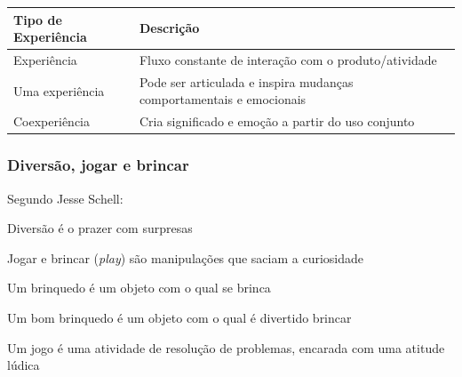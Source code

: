 \expandafter\documentclass\expandafter[table, usenames, svgnames, dvipsnames, \classopts]{beamer}
\begin{document}
\begin{frame}
	\begin{table}
		\tiny
		\setlength{\tabcolsep}{5pt}
		\renewcommand{\arraystretch}{1}
		\begin{tabular}{ll}
			\toprule
			\textbf{Tipo de Experiência} & \textbf{Descrição}\\
			\midrule
			Experiência & Fluxo constante de interação com o produto/atividade\\
			Uma experiência & Pode ser articulada e inspira mudanças comportamentais e emocionais\\
			Coexperiência & Cria significado e emoção a partir do uso conjunto\\
			\bottomrule
		\end{tabular}
	\end{table}

\end{frame}

\begin{frame}
	\frametitle{\textbf{Diversão, jogar e brincar}}

	Segundo Jesse Schell:

	\vspace{1em}

	\begin{outline}
		\1 Diversão é o prazer com surpresas
	    
		\vspace{1em}
	    
		\1 Jogar e brincar (\textit{play}) são manipulações que saciam a curiosidade
		
		\vspace{1em}
			    
		\1 Um brinquedo é um objeto com o qual se brinca

		\vspace{1em}
			    
		\1 Um bom brinquedo é um objeto com o qual é divertido brincar

		\vspace{1em}
			    
		\1 Um jogo é uma atividade de resolução de problemas, encarada com uma atitude lúdica
			
	\end{outline}

\end{frame}
\end{document}
